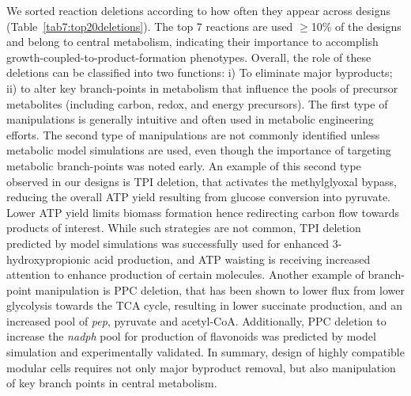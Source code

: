 \documentclass[12pt]{article}
\begin{document}
{We sorted reaction deletions according to how often they appear across designs (Table~\ref{tab7:top20deletions}).
The top 7 reactions are used $\ge$10\% of the designs and belong to central metabolism, indicating their importance to accomplish growth-coupled-to-product-formation phenotypes.
Overall, the role of these deletions can be classified into two functions: i) To eliminate major byproducts; ii) to alter key branch-points in metabolism that influence the pools of precursor metabolites (including carbon, redox, and energy precursors).
The first type of manipulations is generally intuitive and often used in metabolic engineering efforts.\citep{winkler2015}
The second type of manipulations are not commonly identified unless metabolic model simulations are used, \citep{tokuyama2014, venayak2018, chemler2010}
even though the importance of targeting metabolic branch-points was noted early. \citep{stephanopoulos1991}
An example of this second type observed in our designs is TPI deletion, that activates the methylglyoxal bypass,\citep{fong2006} reducing the overall ATP yield resulting from glucose conversion into pyruvate.
Lower ATP yield limits biomass formation hence redirecting carbon flow towards products of interest.
While such strategies are not common, TPI deletion predicted by model simulations was successfully used for enhanced 3-hydroxypropionic acid production,\citep{tokuyama2014} and ATP waisting is receiving increased attention to enhance production of certain molecules.\citep{boecker2019}
Another example of branch-point manipulation is PPC deletion, that has been shown to lower flux from lower glycolysis towards the TCA cycle,\citep{de2006,peng2004} resulting in lower succinate production, and an increased pool of \textit{pep}, pyruvate and acetyl-CoA.
Additionally, PPC deletion to increase the \textit{nadph} pool for production of flavonoids was predicted by model simulation and experimentally validated. \citep{chemler2010}
In summary, design of highly compatible modular cells requires not only major byproduct removal, but also manipulation of key branch points in central metabolism.


}
\end{document}
